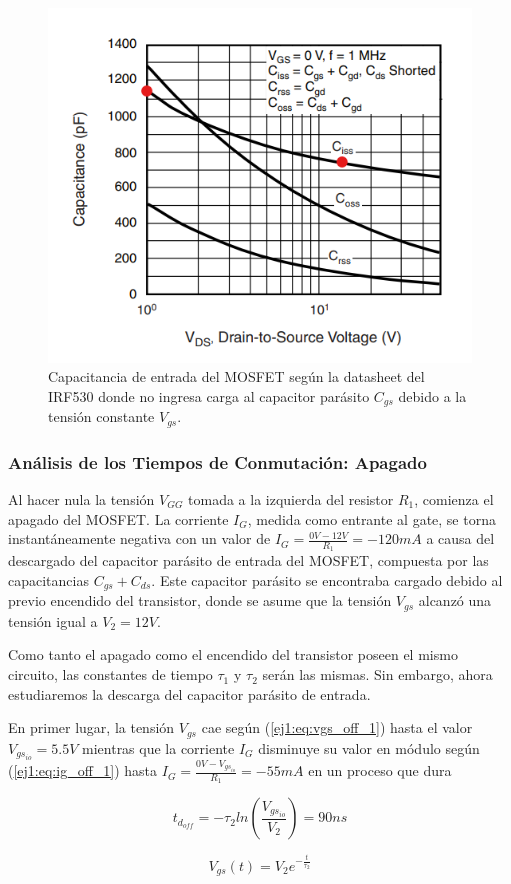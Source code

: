 \begin{figure}[H]
	\centering
	\includegraphics[width=0.4\linewidth]{ImagenesEjercicio-1/Vds-C}
	\caption{Capacitancia de entrada del MOSFET según la datasheet del IRF530 donde no ingresa carga al capacitor parásito $C_{gs}$ debido a la tensión constante $V_{gs}$.}
	\label{ej1:fig:cgd}
\end{figure}

\subsubsection{Análisis de los Tiempos de Conmutación: Apagado}

Al hacer nula la tensión $V_{GG}$ tomada a la izquierda del resistor $R_1$, comienza el apagado del MOSFET. La corriente $I_G$, medida como entrante al gate, se torna instantáneamente negativa con un valor de $I_G = \frac{0V-12V}{R_1} = -120mA$ a causa del descargado del capacitor parásito de entrada del MOSFET, compuesta por las capacitancias $C_{gs} + C_{ds}$. Este capacitor parásito se encontraba cargado debido al previo encendido del transistor, donde se asume que la tensión $V_{gs}$ alcanzó una tensión igual a $V_2 = 12V$.

Como tanto el apagado como el encendido del transistor poseen el mismo circuito, las constantes de tiempo $\tau_1$ y $\tau_2$ serán las mismas. Sin embargo, ahora estudiaremos la descarga del capacitor parásito de entrada.

En primer lugar, la tensión $V_{gs}$ cae según (\ref{ej1:eq:vgs_off_1}) hasta el valor $V_{gs_{io}} = 5.5V$ mientras que la corriente $I_G$ disminuye su valor en módulo según (\ref{ej1:eq:ig_off_1}) hasta $I_G = \frac{0V - V_{gs_{io}}}{R_1} = -55mA$ en un proceso que dura

\begin{equation}
t_{d_{off}} = -\tau_2 ln(\frac{V_{gs_{io}}}{V_2}) = 90ns
\label{ej1:eq:toff}
\end{equation}

\begin{equation}
V_{gs}(t) = V_2e^{-\frac{t}{\tau_2}}
\label{ej1:eq:vgs_off_1}
\end{equation}


